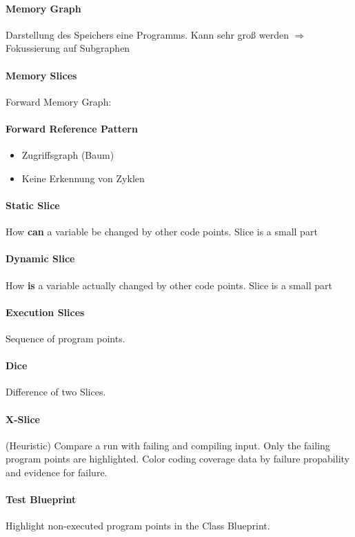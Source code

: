 \documentclass[ngerman]{scrartcl}
\begin{document}
\paragraph{Memory Graph} Darstellung des Speichers eine Programms. Kann sehr groß werden $ \Rightarrow $ Fokussierung auf Subgraphen

\paragraph{Memory Slices} Forward Memory Graph: 

\paragraph{Forward Reference Pattern}
\begin{itemize}
  \item Zugriffsgraph (Baum)
  \item Keine Erkennung von Zyklen
\end{itemize}

\paragraph{Static Slice} How \textbf{can} a variable be changed by other code points. Slice is a small part
\paragraph{Dynamic Slice} How \textbf{is} a variable actually changed by other code points. Slice is a small part
\paragraph{Execution Slices} Sequence of program points.
\paragraph{Dice} Difference of two Slices.

\paragraph{X-Slice} (Heuristic) Compare a run with failing and compiling input. Only the failing program points are highlighted. Color coding coverage data by failure propability and evidence for failure.

\paragraph{Test Blueprint} Highlight non-executed program points in the Class Blueprint. 
\end{document}
